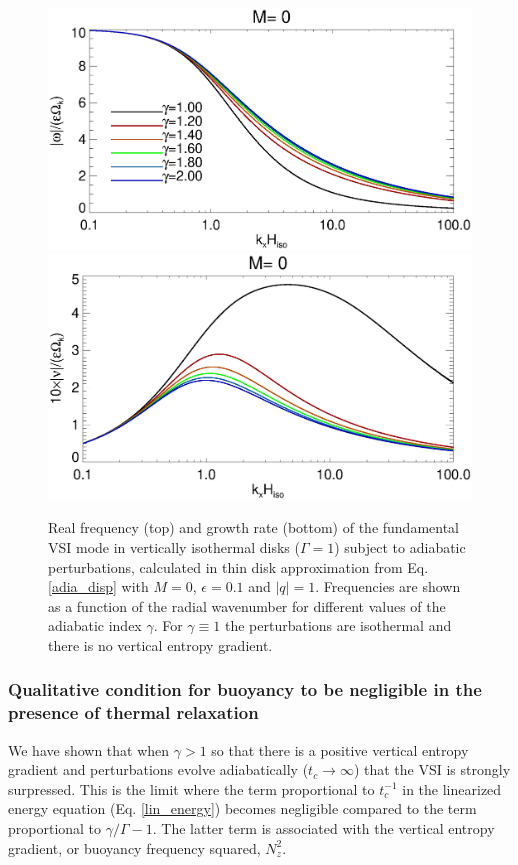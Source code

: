 \begin{figure}
  \includegraphics[width=\linewidth,clip=true,trim=0cm 1.75cm 0cm 0cm]{figures/rate_theory_om}
  \includegraphics[width=\linewidth,clip=true,trim=0cm 0cm 0cm 1cm]{figures/rate_theory_nu}
  \caption{Real frequency (top) and growth rate (bottom) of the fundamental VSI mode in vertically 
    isothermal disks ($\Gamma=1$) subject to adiabatic perturbations,
    calculated in thin disk approximation from Eq. \ref{adia_disp}
    with $M=0$, $\epsilon=0.1$ and  
    $|q|=1$. Frequencies are shown as a function of the radial
    wavenumber for different values of the adiabatic index
    $\gamma$. For $\gamma\equiv 1$ the perturbations are isothermal
    and there is no vertical entropy gradient.\label{adia_growth}}  
\end{figure}   

\subsubsection{Qualitative condition for buoyancy to be negligible in
  the presence of thermal relaxation}
We have shown that when $\gamma>1$ so that there is a positive
vertical entropy gradient and perturbations evolve
adiabatically ($t_c\to\infty$) that the VSI is strongly
surpressed. This is the limit where the term proportional to
$t_c^{-1}$ in the linearized energy equation (Eq. \ref{lin_energy})
becomes negligible compared to the term proportional to
$\gamma/\Gamma-1$. The latter term is associated with the vertical
entropy gradient, or buoyancy frequency squared, $N_z^2$. 


